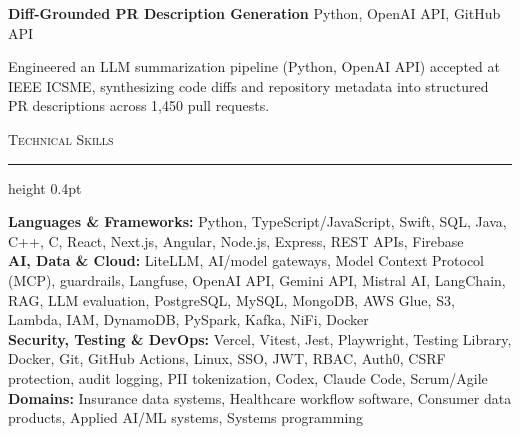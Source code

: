 \documentclass[letterpaper,11pt]{article}
\newcommand{\resumesection}[1]{%
  \par\vspace{2pt}%
  {\large\scshape #1}\par\vspace{2pt}%
  \hrule height 0.4pt\vspace{2pt}%
}
\newcommand{\projectHeading}[2]{
  \textbf{#1} \hfill #2
}
\begin{document}
\vspace{-4pt}
\projectHeading{Diff-Grounded PR Description Generation}{Python, OpenAI API, GitHub API}
\begin{tightitemize}
  \item Engineered an LLM summarization pipeline (Python, OpenAI API) accepted at IEEE ICSME, synthesizing code diffs and repository metadata into structured PR descriptions across 1,450 pull requests.
\end{tightitemize}

\resumesection{Technical Skills}
\textbf{Languages \& Frameworks:} Python, TypeScript/JavaScript, Swift, SQL, Java, C++, C, React, Next.js, Angular, Node.js, Express, REST APIs, Firebase\\
\textbf{AI, Data \& Cloud:} LiteLLM, AI/model gateways, Model Context Protocol (MCP), guardrails, Langfuse, OpenAI API, Gemini API, Mistral AI, LangChain, RAG, LLM evaluation, PostgreSQL, MySQL, MongoDB, AWS Glue, S3, Lambda, IAM, DynamoDB, PySpark, Kafka, NiFi, Docker\\
\textbf{Security, Testing \& DevOps:} Vercel, Vitest, Jest, Playwright, Testing Library, Docker, Git, GitHub Actions, Linux, SSO, JWT, RBAC, Auth0, CSRF protection, audit logging, PII tokenization, Codex, Claude Code, Scrum/Agile\\
\textbf{Domains:} Insurance data systems, Healthcare workflow software, Consumer data products, Applied AI/ML systems, Systems programming
\end{document}
